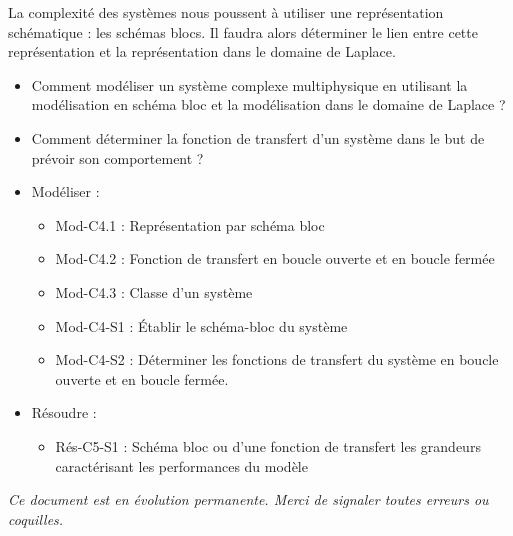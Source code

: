 \documentclass[11pt,oneside]{article}
\begin{document}
La complexité des systèmes nous poussent à utiliser une représentation schématique : les schémas blocs. Il faudra alors déterminer le lien entre cette représentation et la représentation dans le domaine de Laplace.

\vspace{.2cm}


\begin{prob}
\begin{itemize}
\item Comment modéliser un système complexe multiphysique en utilisant la modélisation en schéma bloc et la modélisation dans le domaine de Laplace ?
\item Comment déterminer la fonction de transfert d'un système dans le but de prévoir son comportement ?
\end{itemize}
\end{prob}

\begin{savoir}
\begin{itemize}
\item Modéliser :
\begin{itemize}
\item Mod-C4.1 : Représentation par schéma bloc
\item Mod-C4.2 : Fonction de transfert en boucle ouverte et en boucle fermée
\item Mod-C4.3 : Classe d’un système
\item Mod-C4-S1 : Établir le schéma-bloc du système
\item Mod-C4-S2 : Déterminer les fonctions de transfert du système en boucle ouverte et en boucle fermée.
\end{itemize}
\item Résoudre :
\begin{itemize}
\item Rés-C5-S1 : Schéma bloc ou d’une fonction de transfert les grandeurs caractérisant les performances du modèle
\end{itemize}
\end{itemize}
\end{savoir}



\setlength{\parskip}{0ex plus 0.2ex minus 0ex}
 \renewcommand{\contentsname}{}
 \renewcommand{\baselinestretch}{1}

\textit{Ce document est en évolution permanente. Merci de signaler toutes
erreurs ou coquilles.}
\end{document}
